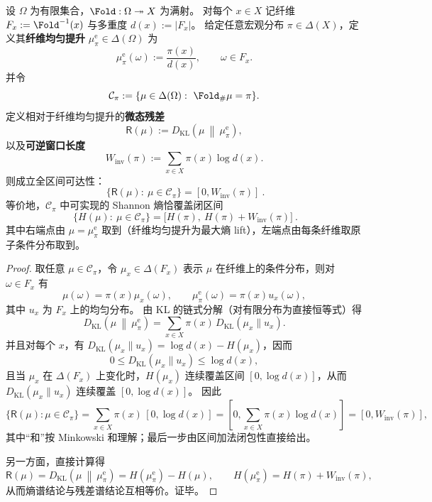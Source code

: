 \begin{theorem}[纤维残差窗口的全区间可达性与熵谱完备]\label{thm:fold-microstate-residual-window-reachability}
设 \(\Omega\) 为有限集合，\(\Fold:\Omega\twoheadrightarrow X\) 为满射。
对每个 \(x\in X\) 记纤维 \(F_x:=\Fold^{-1}(x)\) 与多重度 \(d(x):=|F_x|\)。
给定任意宏观分布 \(\pi\in\Delta(X)\)，定义其\textbf{纤维均匀提升} \(\mu^{\mathrm{e}}_\pi\in\Delta(\Omega)\) 为
\[
\mu^{\mathrm{e}}_\pi(\omega):=\frac{\pi(x)}{d(x)},\qquad \omega\in F_x.
\]
并令
\[
\mathcal{C}_\pi:=\{\mu\in\Delta(\Omega):\ \Fold_{\#}\mu=\pi\}.
\]
定义相对于纤维均匀提升的\textbf{微态残差}
\[
\mathsf{R}(\mu):=D_{\mathrm{KL}}\!\left(\mu\ \middle\|\ \mu^{\mathrm{e}}_\pi\right),
\]
以及\textbf{可逆窗口长度}
\[
W_{\mathrm{inv}}(\pi):=\sum_{x\in X}\pi(x)\log d(x).
\]
则成立全区间可达性：
\[
\boxed{\ \{\mathsf{R}(\mu):\ \mu\in\mathcal{C}_\pi\}=[0,W_{\mathrm{inv}}(\pi)]\ }.
\]
等价地，\(\mathcal{C}_\pi\) 中可实现的 Shannon 熵恰覆盖闭区间
\[
\boxed{\ \{H(\mu):\ \mu\in\mathcal{C}_\pi\}=\bigl[H(\pi),\ H(\pi)+W_{\mathrm{inv}}(\pi)\bigr]\ }.
\]
其中右端点由 \(\mu=\mu^{\mathrm{e}}_\pi\) 取到（纤维均匀提升为最大熵 lift），左端点由每条纤维取原子条件分布取到。
\end{theorem}
\begin{proof}
取任意 \(\mu\in\mathcal{C}_\pi\)，令 \(\mu_x\in\Delta(F_x)\) 表示 \(\mu\) 在纤维上的条件分布，则对 \(\omega\in F_x\) 有
\[
\mu(\omega)=\pi(x)\mu_x(\omega),
\qquad
\mu^{\mathrm{e}}_\pi(\omega)=\pi(x)u_x(\omega),
\]
其中 \(u_x\) 为 \(F_x\) 上的均匀分布。
由 KL 的链式分解（对有限分布为直接恒等式）得
\[
D_{\mathrm{KL}}\!\left(\mu\ \middle\|\ \mu^{\mathrm{e}}_\pi\right)
=\sum_{x\in X}\pi(x)\,D_{\mathrm{KL}}(\mu_x\|u_x).
\]
并且对每个 \(x\)，有 \(D_{\mathrm{KL}}(\mu_x\|u_x)=\log d(x)-H(\mu_x)\)，因而
\[
0\le D_{\mathrm{KL}}(\mu_x\|u_x)\le \log d(x),
\]
且当 \(\mu_x\) 在 \(\Delta(F_x)\) 上变化时，\(H(\mu_x)\) 连续覆盖区间 \([0,\log d(x)]\)，从而 \(D_{\mathrm{KL}}(\mu_x\|u_x)\) 连续覆盖 \([0,\log d(x)]\)。
因此
\[
\{\mathsf{R}(\mu):\mu\in\mathcal{C}_\pi\}
=\sum_{x\in X}\pi(x)\,[0,\log d(x)]
=[0,\sum_{x\in X}\pi(x)\log d(x)]
=[0,W_{\mathrm{inv}}(\pi)],
\]
其中“和”按 Minkowski 和理解；最后一步由区间加法闭包性直接给出。
\par
另一方面，直接计算得
\[
\mathsf{R}(\mu)=D_{\mathrm{KL}}\!\left(\mu\ \middle\|\ \mu^{\mathrm{e}}_\pi\right)
=H(\mu^{\mathrm{e}}_\pi)-H(\mu),
\qquad
H(\mu^{\mathrm{e}}_\pi)=H(\pi)+W_{\mathrm{inv}}(\pi),
\]
从而熵谱结论与残差谱结论互相等价。证毕。
\end{proof}

\endinput
